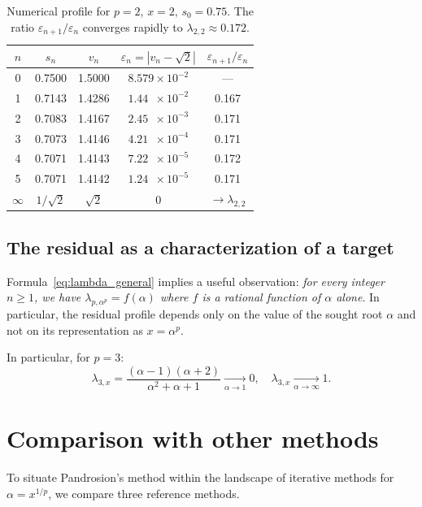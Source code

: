 \documentclass[11pt,a4paper]{article}
\theoremstyle{definition}
\newcommand{\eps}{\varepsilon}
\begin{document}
\begin{table}[h]
\centering
\begin{tabular}{ccccc}
\toprule
$n$ & $s_n$ & $v_n$ & $\eps_n = |v_n - \sqrt{2}|$ & $\eps_{n+1}/\eps_n$ \\
\midrule
0 & 0.7500 & 1.5000 & $8.579\times 10^{-2}$ & --- \\
1 & 0.7143 & 1.4286 & $1.44\phantom{0}\times 10^{-2}$ & 0.167 \\
2 & 0.7083 & 1.4167 & $2.45\phantom{0}\times 10^{-3}$ & 0.171 \\
3 & 0.7073 & 1.4146 & $4.21\phantom{0}\times 10^{-4}$ & 0.171 \\
4 & 0.7071 & 1.4143 & $7.22\phantom{0}\times 10^{-5}$ & 0.172 \\
5 & 0.7071 & 1.4142 & $1.24\phantom{0}\times 10^{-5}$ & 0.171 \\
$\infty$ & $1/\sqrt{2}$ & $\sqrt{2}$ & $0$ & $\to \lambda_{2,2}$ \\
\bottomrule
\end{tabular}
\caption{Numerical profile for $p=2$, $x=2$, $s_0 = 0.75$. The ratio $\eps_{n+1}/\eps_n$ converges rapidly to $\lambda_{2,2} \approx 0.172$.}
\end{table}

\subsection{The residual as a characterization of a target}

Formula~\eqref{eq:lambda_general} implies a useful observation: \textit{for every integer $n \geq 1$, we have $\lambda_{p, \alpha^p} = f(\alpha)$ where $f$ is a rational function of $\alpha$ alone}.  In particular, the residual profile depends only on the value of the sought root $\alpha$ and not on its representation as $x=\alpha^p$.

In particular, for $p = 3$:
\[
  \lambda_{3,x} = \frac{(\alpha-1)(\alpha+2)}{\alpha^2+\alpha+1} \xrightarrow[\alpha \to 1]{} 0, \quad
  \lambda_{3,x} \xrightarrow[\alpha \to \infty]{} 1.
\]

\section{Comparison with other methods}
\label{sec:comparaisons}

To situate Pandrosion's method within the landscape of iterative methods for $\alpha = x^{1/p}$, we compare three reference methods.
\end{document}
